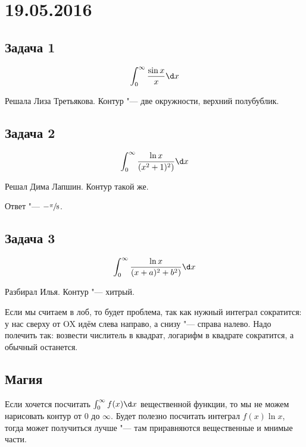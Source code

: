 \chapter{19.05.2016}

\section{Задача 1}
	\[
		\int_0^\infty \frac{\sin x}{x} \d x
	\]

	Решала Лиза Третьякова.
	Контур "--- две окружности, верхний полубублик.

\section{Задача 2}
	\[
		\int_0^\infty \frac{\ln x}{(x^2+1)^2)} \d x
	\]
    
    Решал Дима Лапшин.
    Контур такой же.

    Ответ "--- $-\sfrac{\pi}{8}$.

\section{Задача 3}
	\[
		\int_0^\infty \frac{\ln x}{(x+a)^2+b^2)} \d x
	\]
	
	Разбирал Илья.
	Контур "--- хитрый.

	Если мы считаем в лоб, то будет проблема, так как нужный интеграл сократится:
	у нас сверху от OX идём слева направо, а снизу "--- справа налево.
	Надо полечить так: возвести числитель в квадрат, логарифм в квадрате сократится,
	а обычный останется.

\section{Магия}
	\begin{Rem}
		Если хочется посчитать $\int_0^\infty f(x) \d x$ вещественной функции, то мы
		не можем нарисовать контур от $0$ до $\infty$.
		Будет полезно посчитать интеграл $f(x)\ln x$, тогда может получиться лучше "---
		там приравняются вещественные и мнимые части.
	\end{Rem}
